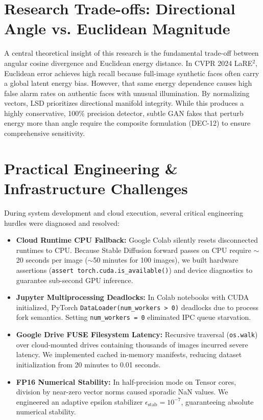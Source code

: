 \documentclass[12pt,a4paper]{report}
\begin{document}
\section{Research Trade-offs: Directional Angle vs. Euclidean Magnitude}
A central theoretical insight of this research is the fundamental trade-off between angular cosine divergence and Euclidean energy distance. In CVPR 2024 LaRE$^2$, Euclidean error achieves high recall because full-image synthetic faces often carry a global latent energy bias. However, that same energy dependence causes high false alarm rates on authentic faces with unusual illumination. By normalizing vectors, LSD prioritizes directional manifold integrity. While this produces a highly conservative, 100\% precision detector, subtle GAN fakes that perturb energy more than angle require the composite formulation (DEC-12) to ensure comprehensive sensitivity.

\section{Practical Engineering \& Infrastructure Challenges}
During system development and cloud execution, several critical engineering hurdles were diagnosed and resolved:
\begin{itemize}
    \item \textbf{Cloud Runtime CPU Fallback:} Google Colab silently resets disconnected runtimes to CPU. Because Stable Diffusion forward passes on CPU require $\sim$20 seconds per image ($\sim$50 minutes for 100 images), we built hardware assertions (\texttt{assert torch.cuda.is\_available()}) and device diagnostics to guarantee sub-second GPU inference.
    \item \textbf{Jupyter Multiprocessing Deadlocks:} In Colab notebooks with CUDA initialized, PyTorch \texttt{DataLoader(num\_workers > 0)} deadlocks due to process fork semantics. Setting \texttt{num\_workers = 0} eliminated IPC queue starvation.
    \item \textbf{Google Drive FUSE Filesystem Latency:} Recursive traversal (\texttt{os.walk}) over cloud-mounted drives containing thousands of images incurred severe latency. We implemented cached in-memory manifests, reducing dataset initialization from 20 minutes to 0.01 seconds.
    \item \textbf{FP16 Numerical Stability:} In half-precision mode on Tensor cores, division by near-zero vector norms caused sporadic NaN values. We engineered an adaptive epsilon stabilizer $\epsilon_{\text{stab}} = 10^{-7}$, guaranteeing absolute numerical stability.
\end{itemize}
\end{document}

